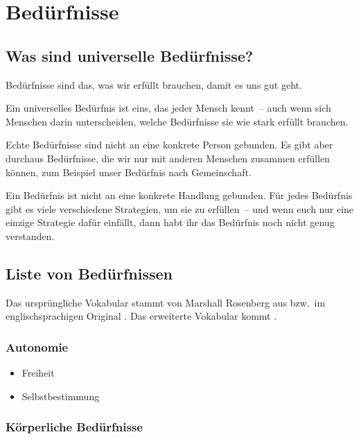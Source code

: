 \section{Bedürfnisse}
\label{beduerfnisse}

\subsection{Was sind universelle Bedürfnisse?}

Bedürfnisse sind das, was wir erfüllt brauchen, damit es uns gut geht.

Ein universelles Bedürfnis ist eins, das jeder Mensch kennt~-- auch wenn sich Menschen darin unterscheiden, welche Bedürfnisse sie wie stark erfüllt brauchen.

Echte Bedürfnisse sind nicht an eine konkrete Person gebunden. Es gibt aber durchaus Bedürfnisse, die wir nur mit anderen Menschen zusammen erfüllen können, zum Beispiel unser Bedürfnis nach Gemeinschaft.

Ein Bedürfnis ist nicht an eine konkrete Handlung gebunden. Für jedes Bedürfnis gibt es viele verschiedene Strategien, um sie zu erfüllen~-- und wenn euch nur eine einzige Strategie dafür einfällt, dann habt ihr das Bedürfnis noch nicht genug verstanden.

\subsection{Liste von Bedürfnissen}

Das ursprüngliche Vokabular stammt von Marshall Rosenberg aus \cite[S.~216~f]{gfk-rosenberg} bzw.~im englischsprachigen Original \cite[S.~210]{nvc-rosenberg}. Das erweiterte Vokabular kommt \cite[S.~75~f]{gfk-dummies}.


\subsubsection{Autonomie}

\begin{multicols}{2}
  \begin{itemize}
    \item Freiheit
    \item Selbstbestimmung
  \end{itemize}
\end{multicols}


\subsubsection{Körperliche Bedürfnisse}


